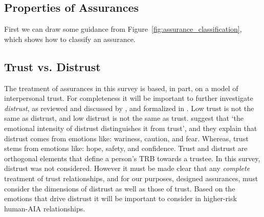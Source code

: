 
\subsection{Properties of Assurances}
First we can draw some guidance from Figure~\ref{fig:assurance_classification}, which shows how to classify an assurance.





\subsection{Trust vs. Distrust}
The treatment of assurances in this survey is based, in part, on a model of interpersonal trust. For completeness it will be important to further investigate \textit{distrust}, as reviewed and discussed by \citet{Lewicki1998-ox}, and formalized in \citet{McKnight2001-gz}. Low trust is not the same as distrust, and low distrust is not the same as trust. \citet{McKnight2001-gz} suggest that `the emotional intensity of distrust distinguishes it from trust', and they explain that distrust comes from emotions like: wariness, caution, and fear. Whereas, trust stems from emotions like: hope, safety, and confidence. Trust and distrust are orthogonal elements that define a person's TRB towards a trustee. In this survey, distrust was not considered. However it must be made clear that any \emph{complete} treatment of trust relationships, and for our purposes, designed assurances, must consider the dimensions of distrust as well as those of trust. Based on the emotions that drive distrust it will be important to consider in higher-risk human-AIA relationships.

